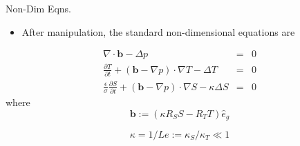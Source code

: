 \documentclass[compress,12pt]{beamer}
\newcommand{\bv}[1]{{\boldsymbol{#1}}}
\newcommand{\D} [2]{\frac{\partial #1}{\partial #2}}
\begin{document}
\begin{frame}{Non-Dim Eqns.}
  \begin{itemize}
    \item After manipulation, the standard non-dimensional equations are
  \end{itemize}

  \begin{eqnarray}
    \nonumber
    \label{eqn:mom-nondim}
    \nabla \cdot \bv{b} - \Delta p &=& 0 \\
    \nonumber
    \label{eqn:T-nondim}
    \D{T}{t} +  (\bv{b}- \nabla p) \cdot \nabla T  - \Delta T &=& 0 \\
    \nonumber
    \label{eqn:S-nondim}
    \frac{\epsilon}{\sigma} \D{S}{t} + (\bv{b} -
    \nabla p) \cdot \nabla S  - \kappa \Delta S &=&  0
  \end{eqnarray}
  where
  \begin{equation}
    \label{eqn:buoyant_force}
    \bv{b}:=(\kappa R_S S - R_T T)\hat{e}_g
  \end{equation}

  \begin{equation}
    \label{eqn:kappa}
    \kappa = 1/Le := \kappa_S / \kappa_T \ll 1
  \end{equation}

\end{frame}
\end{document}
